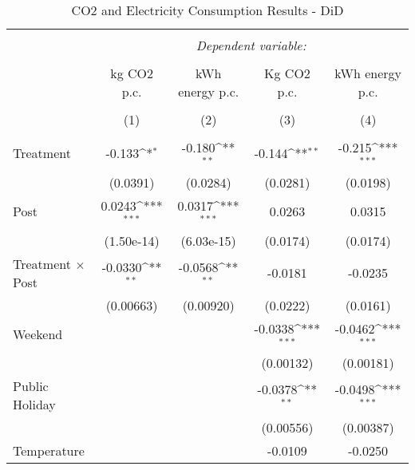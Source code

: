 \def\sym#1{\ifmmode^{#1}\else\(^{#1}\)\fi}

\begin{table}[!htbp] \centering 
  \caption{CO2 and Electricity Consumption Results - DiD} 
  \label{Main-DiD-Results} 
\small 
\def\sym#1{\ifmmode^{#1}\else\(^{#1}\)\fi}
\begin{tabular}{l*{4}{c}}
\\[-1.8ex]\hline 
\hline \\[-1.8ex] 
 & \multicolumn{4}{c}{\textit{Dependent variable:}} \\ 
\cline{2-5} 
\\[-1.8ex] &\multicolumn{1}{c}{kg CO2 p.c.}&\multicolumn{1}{c}{kWh energy p.c.}&\multicolumn{1}{c}{Kg CO2 p.c.}&\multicolumn{1}{c}{kWh energy p.c.}\\ 
\\[-1.8ex] & \multicolumn{1}{c}{(1)} & \multicolumn{1}{c}{(2)} & \multicolumn{1}{c}{(3)} & \multicolumn{1}{c}{(4)}\\ 
\hline \\[-1.8ex] 
Treatment &      -0.133\sym{*}  &      -0.180\sym{**} &      -0.144\sym{**} &      -0.215\sym{***}\\
                    &    (0.0391)         &    (0.0284)         &    (0.0281)         &    (0.0198)         \\
[1em]
Post &      0.0243\sym{***}&      0.0317\sym{***}&      0.0263         &      0.0315         \\
                    &  (1.50e-14)         &  (6.03e-15)         &    (0.0174)         &    (0.0174)         \\
[1em]
Treatment $\times$ Post &     -0.0330\sym{**} &     -0.0568\sym{**} &     -0.0181         &     -0.0235         \\
                    &   (0.00663)         &   (0.00920)         &    (0.0222)         &    (0.0161)         \\
[1em]
Weekend &                     &                     &     -0.0338\sym{***}&     -0.0462\sym{***}\\
                    &                     &                     &   (0.00132)         &   (0.00181)         \\
[1em]
Public Holiday &                     &                     &     -0.0378\sym{**} &     -0.0498\sym{***}\\
                    &                     &                     &   (0.00556)         &   (0.00387)         \\
[1em]
Temperature &                     &                     &     -0.0109         &     -0.0250         \\

\end{tabular}
\end{table}
